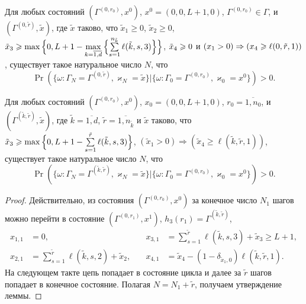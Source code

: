 \documentclass[a4paper,12pt,russian]{extarticle}
\begin{document}
\begin{lemma}
Для любых состояний $(\Gamma^{(0,r_0)},x^0)$, $x^0=(0,0,L+1,0)$, $\Gamma^{(0,r_0)} \in \Gamma$, и
$(\Gamma^{(0,\tilde{r})},\tilde{x})$,
где $\tilde{x}$ таково, что $\tilde{x}_1 \geqslant 0$, $\tilde{x}_2\geqslant 0$, $\tilde{x}_3\hm\geqslant \max{}\Bigl\{0,L+1\hm-\max\limits_{k=\overline{1,d}}{\Bigl\{\sum\limits_{s=1}^{n_{\tilde{k}}} \ell(\tilde{k},s,3)\Bigr\}}\Bigr\}$, $\tilde{x}_4\hm\geqslant 0$ и $(x_1 > 0)\hm\Rightarrow (x_4\geqslant \ell(0,\tilde{r},1))$, существует такое натуральное число $N$, что 
\begin{equation*}
\Pr(\{\omega\colon \Gamma_{N}=\Gamma^{(0,\tilde{r} )}, \varkappa_{N}=\tilde{x}\}|\{\omega\colon 
\Gamma_{0}=\Gamma^{(0,r_0)}, \varkappa_{0}=x^0\})>0.
\end{equation*}
\end{lemma}

\begin{lemma}
Для любых состояний $(\Gamma^{(0,r_0)},x^0)$, $x_0=(0,0,L+1,0)$, $r_0=\overline{1,n_0}$, и
$(\Gamma^{(\tilde{k},\tilde{r})},\tilde{x})$,
где $\tilde{k}=\overline{1,d}$, $\tilde{r} = \overline{1,n_{\tilde{k}}}$ и $\tilde{x}$ таково, что $\tilde{x}_3\geqslant \max{\Bigl\{0,L+1-\sum\limits_{s=1}^{\tilde{r}}\ell(\tilde{k},s,3)\Bigr\}}$,
$(\tilde{x}_1>0) \Rightarrow (\tilde{x}_4\geqslant \ell(\tilde{k},\tilde{r},1))$, существует такое натуральное число $N$, что 
\begin{equation*}
\Pr(\{\omega\colon \Gamma_{N}=\Gamma^{(\tilde{k},\tilde{r} )}, \varkappa_{N}=\tilde{x}\}|\{\omega\colon 
\Gamma_{0}=\Gamma^{(0,r_0)}, \varkappa_{0}=x^0\})>0.
\end{equation*}
\label{last:lemma}
\end{lemma}
\begin{proof}
Действительно, из состояния $(\Gamma^{(0,r_0)},x^0)$ за конечное число $N_1$ шагов можно перейти в состояние $(\Gamma^{(0,r_1)},x^1)$, $h_3(r_1)=\Gamma^{(\tilde{k},\tilde{r})}$,
\begin{align*}
x_{1,1}&=0,& \quad x_{3,1}&=\sum_{s=1}^{\tilde{r}} \ell(\tilde{k},s,3) +\tilde{x}_3\geqslant L+1, \\
x_{2,1}&=\sum_{s=1}^{\tilde{r}} \ell(\tilde{k},s,2) + \tilde{x}_2,& \quad x_{4,1}&=\tilde{x}_4 -  (1- \delta_{\tilde{x}_1,0}) \ell(\tilde{k},\tilde{r},1).
\end{align*}
На следующем такте цепь попадает в состояние цикла и далее за $\tilde{r}$ шагов попадает в конечное состояние. Полагая $N=N_1+\tilde{r}$, получаем утверждение леммы.
\end{proof}
\end{document}
